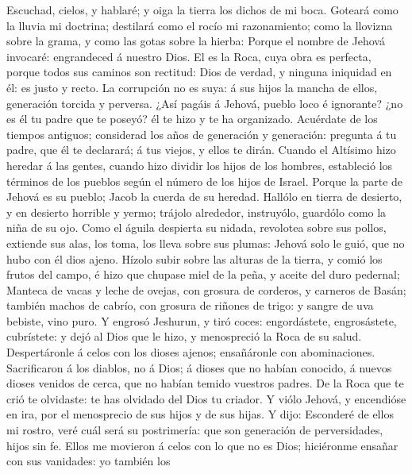  Escuchad, cielos, y hablaré; y oiga la tierra los dichos de
mi boca.  Goteará como la lluvia mi doctrina; destilará como
el rocío mi razonamiento; como la llovizna sobre la grama, y como las
gotas sobre la hierba:  Porque el nombre de Jehová invocaré:
engrandeced á nuestro Dios.  El es la Roca, cuya obra es
perfecta, porque todos sus caminos son rectitud: Dios de verdad, y
ninguna iniquidad en él: es justo y recto.  La corrupción no
es suya: á sus hijos la mancha de ellos, generación torcida y perversa.
 ¿Así pagáis á Jehová, pueblo loco é ignorante? ¿no es él tu
padre que te poseyó? él te hizo y te ha organizado. 
Acuérdate de los tiempos antiguos; considerad los años de generación y
generación: pregunta á tu padre, que él te declarará; á tus viejos, y
ellos te dirán.  Cuando el Altísimo hizo heredar á las
gentes, cuando hizo dividir los hijos de los hombres, estableció los
términos de los pueblos según el número de los hijos de Israel.
 Porque la parte de Jehová es su pueblo; Jacob la cuerda de
su heredad.  Hallólo en tierra de desierto, y en desierto
horrible y yermo; trájolo alrededor, instruyólo, guardólo como la niña
de su ojo.  Como el águila despierta su nidada, revolotea
sobre sus pollos, extiende sus alas, los toma, los lleva sobre sus
plumas:  Jehová solo le guió, que no hubo con él dios
ajeno.  Hízolo subir sobre las alturas de la tierra, y
comió los frutos del campo, é hizo que chupase miel de la peña, y aceite
del duro pedernal;  Manteca de vacas y leche de ovejas, con
grosura de corderos, y carneros de Basán; también machos de cabrío, con
grosura de riñones de trigo: y sangre de uva bebiste, vino puro.
 Y engrosó Jeshurun, y tiró coces: engordástete,
engrosástete, cubrístete: y dejó al Dios que le hizo, y menospreció la
Roca de su salud.  Despertáronle á celos con los dioses
ajenos; ensañáronle con abominaciones.  Sacrificaron á los
diablos, no á Dios; á dioses que no habían conocido, á nuevos dioses
venidos de cerca, que no habían temido vuestros padres.  De
la Roca que te crió te olvidaste: te has olvidado del Dios tu criador.
 Y viólo Jehová, y encendióse en ira, por el menosprecio de
sus hijos y de sus hijas.  Y dijo: Esconderé de ellos mi
rostro, veré cuál será su postrimería: que son generación de
perversidades, hijos sin fe.  Ellos me movieron á celos con
lo que no es Dios; hiciéronme ensañar con sus vanidades: yo también los
